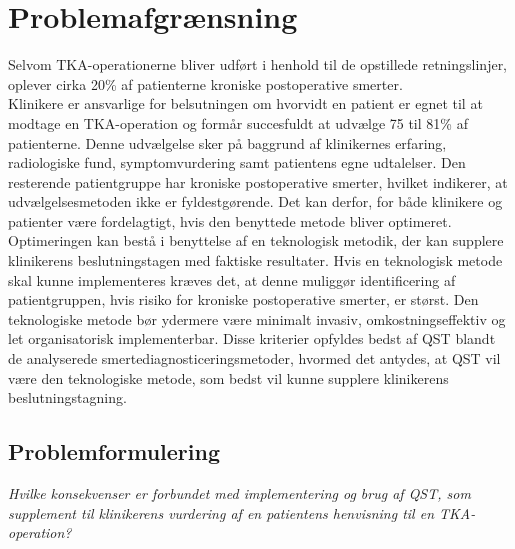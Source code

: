 \section{Problemafgrænsning}
Selvom TKA-operationerne bliver udført i henhold til de opstillede retningslinjer, oplever cirka 20\% af patienterne kroniske postoperative smerter.\\
Klinikere er ansvarlige for belsutningen om hvorvidt en patient er egnet til at modtage en TKA-operation og formår succesfuldt at udvælge 75 til 81\% af patienterne. Denne udvælgelse sker på baggrund af klinikernes erfaring, radiologiske fund, symptomvurdering samt patientens egne udtalelser. Den resterende patientgruppe har kroniske postoperative smerter, hvilket indikerer, at udvælgelsesmetoden ikke er fyldestgørende. Det kan derfor, for både klinikere og patienter være fordelagtigt, hvis den benyttede metode bliver optimeret. Optimeringen kan bestå i benyttelse af en teknologisk metodik, der kan supplere klinikerens beslutningstagen med faktiske resultater. Hvis en teknologisk metode skal kunne implementeres kræves det, at denne muliggør identificering af patientgruppen, hvis risiko for kroniske postoperative smerter, er størst. Den teknologiske metode bør ydermere være minimalt invasiv, omkostningseffektiv og let organisatorisk implementerbar. Disse kriterier opfyldes bedst af QST blandt de analyserede smertediagnosticeringsmetoder, hvormed det antydes, at QST vil være den teknologiske metode, som bedst vil kunne supplere klinikerens beslutningstagning. 

\subsection{Problemformulering}
\begin{center}
	\textit{Hvilke konsekvenser er forbundet med implementering og brug af QST, som supplement til
		klinikerens vurdering af en patientens henvisning til en TKA-operation?}
\end{center}
